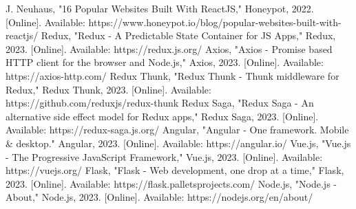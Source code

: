 \documentclass[conference]{IEEEtran}
\begin{document}
\begin{thebibliography}{00}
 J. Neuhaus, "16 Popular Websites Built With ReactJS," Honeypot, 2022. [Online]. Available: https://www.honeypot.io/blog/popular-websites-built-with-reactjs/
 Redux, "Redux - A Predictable State Container for JS Apps," Redux, 2023. [Online]. Available: https://redux.js.org/
 Axios, "Axios - Promise based HTTP client for the browser and Node.js," Axios, 2023. [Online]. Available: https://axios-http.com/
 Redux Thunk, "Redux Thunk - Thunk middleware for Redux," Redux Thunk, 2023. [Online]. Available: https://github.com/reduxjs/redux-thunk
 Redux Saga, "Redux Saga - An alternative side effect model for Redux apps," Redux Saga, 2023. [Online]. Available: https://redux-saga.js.org/
 Angular, "Angular - One framework. Mobile \& desktop." Angular, 2023. [Online]. Available: https://angular.io/
 Vue.js, "Vue.js - The Progressive JavaScript Framework," Vue.js, 2023. [Online]. Available: https://vuejs.org/
 Flask, "Flask - Web development, one drop at a time," Flask, 2023. [Online]. Available: https://flask.palletsprojects.com/
 Node.js, "Node.js - About," Node.js, 2023. [Online]. Available: https://nodejs.org/en/about/
\end{thebibliography}
\vspace{12pt}
\end{document}
